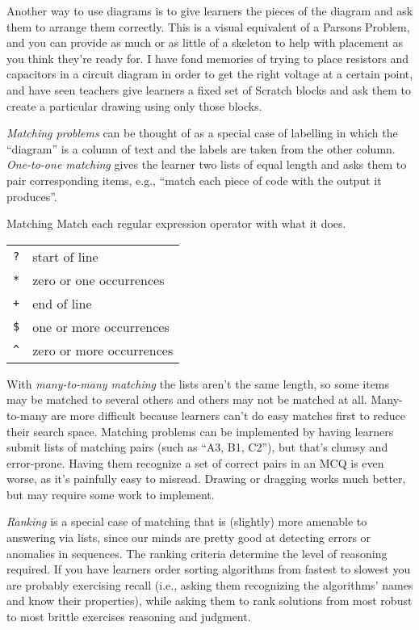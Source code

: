 
Another way to use diagrams is
to give learners the pieces of the diagram and ask them to arrange them correctly.
This is a visual equivalent of a Parsons Problem,
and you can provide as much or as little of a skeleton to help with placement
as you think they're ready for.
I have fond memories of trying to place resistors and capacitors in a circuit diagram
in order to get the right voltage at a certain point,
and have seen teachers give learners a fixed set of Scratch blocks
and ask them to create a particular drawing using only those blocks.

\emph{Matching problems} can be thought of as a special case of labelling
in which the ``diagram'' is a column of text
and the labels are taken from the other column.
\emph{One-to-one matching} gives the learner two lists of equal length
and asks them to pair corresponding items,
e.g., ``match each piece of code with the output it produces''.

\begin{aside}{Matching}
  Match each regular expression operator with what it does.

  \begin{longtable}{ll}
    \texttt{?} & start of line\\
    \texttt{*} & zero or one occurrences\\
    \texttt{+} & end of line\\
    \texttt{\$} & one or more occurrences\\
    \texttt{\^{}} & zero or more occurrences\\
  \end{longtable}
\end{aside}

With \emph{many-to-many matching} the lists aren't the same length,
so some items may be matched to several others
and others may not be matched at all.
Many-to-many are more difficult
because learners can't do easy matches first to reduce their search space.
Matching problems can be implemented by having learners submit lists of matching pairs
(such as ``A3, B1, C2''),
but that's clumsy and error-prone.
Having them recognize a set of correct pairs in an MCQ is even worse,
as it's painfully easy to misread.
Drawing or dragging works much better,
but may require some work to implement.

\emph{Ranking} is a special case of matching
that is (slightly) more amenable to answering via lists,
since our minds are pretty good at detecting errors or anomalies in sequences.
The ranking criteria determine the level of reasoning required.
If you have learners order sorting algorithms from fastest to slowest
you are probably exercising recall
(i.e., asking them recognizing the algorithms' names and know their properties),
while asking them to rank solutions from most robust to most brittle
exercises reasoning and judgment.


